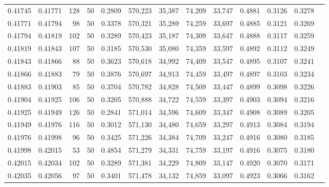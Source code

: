\begin{tabular}{rrrrrrrrrrrrr}
0.41745 & 0.41771 &   128 &  50 &                                     0.2809 & 570,223 &  35,387 &  74,209 &  33,747 & 0.4881 & 0.3126 & 0.3278 \\
0.41771 & 0.41794 &    98 &  50 &                                     0.3378 & 570,321 &  35,289 &  74,259 &  33,697 & 0.4885 & 0.3121 & 0.3269 \\
0.41794 & 0.41819 &   102 &  50 &                                     0.3289 & 570,423 &  35,187 &  74,309 &  33,647 & 0.4888 & 0.3117 & 0.3259 \\
0.41819 & 0.41843 &   107 &  50 &                                     0.3185 & 570,530 &  35,080 &  74,359 &  33,597 & 0.4892 & 0.3112 & 0.3249 \\
0.41843 & 0.41866 &    88 &  50 &                                     0.3623 & 570,618 &  34,992 &  74,409 &  33,547 & 0.4895 & 0.3107 & 0.3241 \\
0.41866 & 0.41883 &    79 &  50 &                                     0.3876 & 570,697 &  34,913 &  74,459 &  33,497 & 0.4897 & 0.3103 & 0.3234 \\
0.41883 & 0.41903 &    85 &  50 &                                     0.3704 & 570,782 &  34,828 &  74,509 &  33,447 & 0.4899 & 0.3098 & 0.3226 \\
0.41904 & 0.41925 &   106 &  50 &                                     0.3205 & 570,888 &  34,722 &  74,559 &  33,397 & 0.4903 & 0.3094 & 0.3216 \\
0.41925 & 0.41949 &   126 &  50 &                                     0.2841 & 571,014 &  34,596 &  74,609 &  33,347 & 0.4908 & 0.3089 & 0.3205 \\
0.41949 & 0.41976 &   116 &  50 &                                     0.3012 & 571,130 &  34,480 &  74,659 &  33,297 & 0.4913 & 0.3084 & 0.3194 \\
0.41976 & 0.41998 &    96 &  50 &                                     0.3425 & 571,226 &  34,384 &  74,709 &  33,247 & 0.4916 & 0.3080 & 0.3185 \\
0.41998 & 0.42015 &    53 &  50 &                                     0.4854 & 571,279 &  34,331 &  74,759 &  33,197 & 0.4916 & 0.3075 & 0.3180 \\
0.42015 & 0.42034 &   102 &  50 &                                     0.3289 & 571,381 &  34,229 &  74,809 &  33,147 & 0.4920 & 0.3070 & 0.3171 \\
0.42035 & 0.42056 &    97 &  50 &                                     0.3401 & 571,478 &  34,132 &  74,859 &  33,097 & 0.4923 & 0.3066 & 0.3162 \\

\end{tabular}
